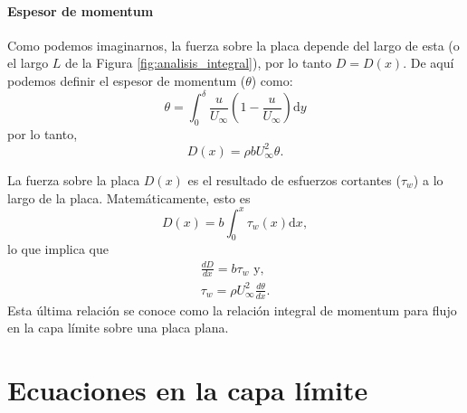 \paragraph*{Espesor de momentum}
Como podemos imaginarnos, la fuerza sobre la placa depende del largo de esta (o el largo $L$ de la Figura \ref{fig:analisis_integral}), por lo tanto $D=D(x)$.
De aquí podemos definir el espesor de momentum ($\theta$) como:
%
\begin{equation}\label{eq:espesor_momentum}
\theta = \int_0^\delta \frac{u}{U_\infty}\left(1-\frac{u}{U_\infty}\right)\mathrm{d}y
\end{equation}
%
por lo tanto,
%
\begin{equation}
D(x) = \rho b U_\infty^2\theta.
\end{equation}

La fuerza sobre la placa $D(x)$ es el resultado de esfuerzos cortantes ($\tau_w$) a lo largo de la placa.
Matemáticamente, esto es
%
\begin{equation}
D(x) = b\int_0^x \tau_w(x)\mathrm{d}x,
\end{equation}
%
lo que implica que
%
\begin{align}
\frac{dD}{dx}=b\tau_w \text{ y, }\nonumber\\
\tau_w=\rho U_\infty^2 \frac{d\theta}{dx}.
\end{align}
%
Esta última relación se conoce como la relación integral de momentum para flujo en la capa límite sobre una placa plana.

\section*{Ecuaciones en la capa límite}
